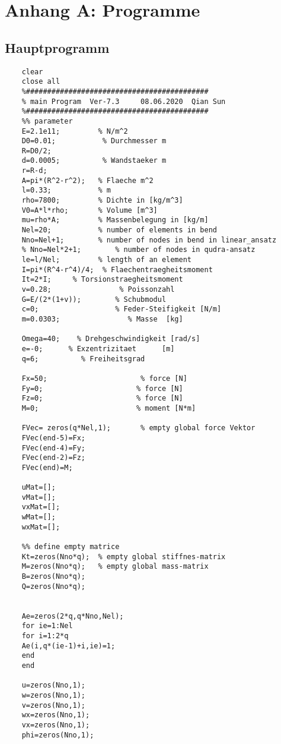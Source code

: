 	\pagestyle{fancy}
	\setcounter{page}{1} 
	\section*{Anhang A: Programme}
	\subsection*{Hauptprogramm}
	\begin{lstlisting}
	clear
	close all
	%###########################################
	% main Program  Ver-7.3     08.06.2020  Qian Sun  
	%###########################################
	%% parameter
	E=2.1e11;         % N/m^2
	D0=0.01;           % Durchmesser m
	R=D0/2;
	d=0.0005;          % Wandstaeker m
	r=R-d;
	A=pi*(R^2-r^2);   % Flaeche m^2
	l=0.33;           % m
	rho=7800;         % Dichte in [kg/m^3]
	V0=A*l*rho;       % Volume [m^3]
	mu=rho*A;         % Massenbelegung in [kg/m]
	Nel=20;           % number of elements in bend
	Nno=Nel+1;        % number of nodes in bend in linear_ansatz
	% Nno=Nel*2+1;        % number of nodes in qudra-ansatz
	le=l/Nel;         % length of an element
	I=pi*(R^4-r^4)/4;  % Flaechentraegheitsmoment
	It=2*I;     % Torsionstraegheitsmoment
	v=0.28;                % Poissonzahl
	G=E/(2*(1+v));        % Schubmodul
	c=0;                  % Feder-Steifigkeit [N/m]
	m=0.0303;                % Masse  [kg]
	
	Omega=40;    % Drehgeschwindigkeit [rad/s]
	e=-0;      % Exzentrizitaet      [m]
	q=6;          % Freiheitsgrad
	
	Fx=50;                      % force [N]
	Fy=0;                      % force [N]
	Fz=0;                      % force [N]
	M=0;                       % moment [N*m]
	
	FVec= zeros(q*Nel,1);       % empty global force Vektor 
	FVec(end-5)=Fx;
	FVec(end-4)=Fy;
	FVec(end-2)=Fz;
	FVec(end)=M;
	
	uMat=[];
	vMat=[];
	vxMat=[];
	wMat=[];
	wxMat=[];
	
	%% define empty matrice
	Kt=zeros(Nno*q);  % empty global stiffnes-matrix 
	M=zeros(Nno*q);   % empty global mass-matrix 
	B=zeros(Nno*q);   
	Q=zeros(Nno*q);
	
	
	Ae=zeros(2*q,q*Nno,Nel);
	for ie=1:Nel
	for i=1:2*q
	Ae(i,q*(ie-1)+i,ie)=1;
	end
	end
	
	u=zeros(Nno,1);
	w=zeros(Nno,1);
	v=zeros(Nno,1);
	wx=zeros(Nno,1);
	vx=zeros(Nno,1);
	phi=zeros(Nno,1);
	

\end{lstlisting}
